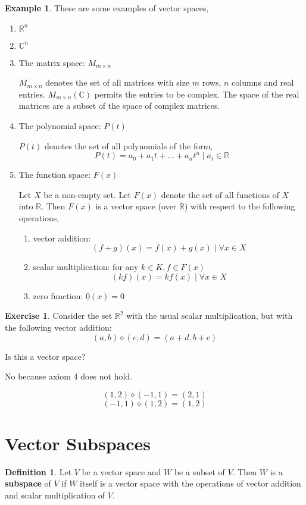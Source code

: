 \documentclass{report}
\theoremstyle{definition}
\newtheorem{_exc}{Exercise}[section]
\newtheorem*{_def}{Definition}
\newtheorem{ex}{Example}[section]
\theoremstyle{remark}
\begin{document}
\begin{ex}
These are some examples of vector spaces,
\begin{enumerate}
 \item $\mathbb{R}^n$
 \item $\mathbb{C}^n$
 \item The matrix space: $M_{m\times n}$
 
 $M_{m\times n}$ denotes the set of all matrices with size $m$ rows, $n$ columns and real entries.
 $M_{m\times n}(\mathbb{C})$ permits the entries to be complex.
 The space of the real matrices are a subset of the space of complex matrices.
 \item The polynomial space: $P(t)$
 
 $P(t)$ denotes the set of all polynomials of the form,
 \[P(t)=a_0+a_1t+...+a_nt^n \mid a_i\in \mathbb{R}\]
 \item The function space: $F(x)$
 
 Let $X$ be a non-empty set.
 Let $F(x)$ denote the set of all functions of $X$ into $\mathbb{R}$.
 Then $F(x)$ is a vector space (over $\mathbb{R}$) with respect to the following operations,
 \begin{enumerate}[i]
  \item vector addition: 
  \[(f+g)(x)=f(x)+g(x)\mid \forall x\in X\]
  \item scalar multiplication: for any $k\in K, f\in F(x)$
  \[(kf)(x)=kf(x) \mid \forall x\in X\]
  \item zero function: $\underline{0}(x)=0$ 
 \end{enumerate}
\end{enumerate}
\end{ex}

\begin{_exc}
Consider the set $\mathbb{R}^2$ with the usual scalar multiplication, but with the following vector addition:
\[(a,b)\diamond (c,d)=(a+d,b+c)\]

Is this a vector space?

No because axiom 4 does not hold.

\[(1,2)\diamond (-1,1)=(2,1)\]
\[(-1,1)\diamond (1,2)=(1,2)\]
\end{_exc}

\section{Vector Subspaces}

\begin{_def}
Let $V$ be a vector space and $W$ be a subset of $V$.
Then $W$ is a \textbf{subspace} of $V$ if $W$ itself is a vector space with the operations of vector addition and scalar multiplication of $V$.
\end{_def}
\end{document}
